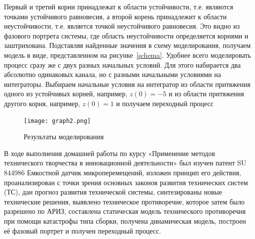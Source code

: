 Первый и третий корни принадлежат к области устойчивости, т.е. являются точками устойчивого равновесия, а второй корень принадлежит к области неустойчивости, т.е. является точкой неустойчивого равновесия. Это видно из фазового портрета системы, где область неустойчивости определяется корнями  и заштрихована.
Подставляя найденные значения в схему моделирования, получаем модель в виде, представленном на рисунке~\ref{schema}. Удобнее всего моделировать процесс сразу же с двух разных начальных условий. Для этого набирается два абсолютно одинаковых канала, но с разными начальными условиями на интеграторы. 
Выбираем начальные условия на интегратор из области притяжения одного из устойчивых корней, например, $z(0)=-5$ и из области притяжения другого корня, например, $z(0)=1$ и получаем переходный процесс

\begin{figure}[h!]
	\centering
	\texttt{[image: graph2.png]}
	\caption{Результаты моделирования}
	\label{aaa}
\end{figure}

В ходе выполнения домашней работы по курсу «Применение методов технического творчества в инновационной деятельности» был изучен патент SU 844986 \glqq Емкостной датчик микроперемещений\grqq, изложен принцип его действия, проанализирован с точки зрения основных законов развития технических систем (ТС), дан прогноз развития технической системы, синтезированы новые технические решения, выявлено техническое противоречие, которое затем было разрешено по АРИЗ, составлена статическая модель технического противоречия при помощи катастрофы типа сборки, получена динамическая модель, построен её фазовый портрет и получен переходный процесс.


\newpage
